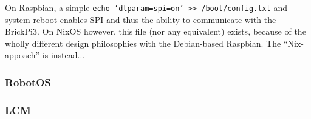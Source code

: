 On Raspbian, a simple \texttt{echo 'dtparam=spi=on' >> /boot/config.txt} and system reboot enables SPI and thus the ability to communicate with the BrickPi3.
On NixOS however, this file (nor any equivalent) exists, because of the wholly different design philosophies with the Debian-based Raspbian.
The ``Nix-appoach'' is instead...

\subsubsection{RobotOS}

\subsubsection{LCM}
